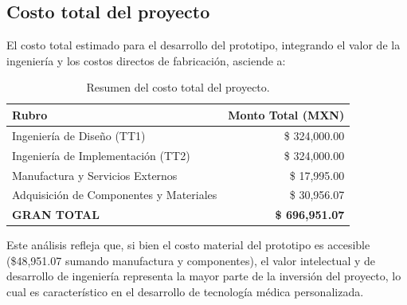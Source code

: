 \subsection{Costo total del proyecto}

El costo total estimado para el desarrollo del prototipo, integrando el valor de la ingeniería y los costos directos de fabricación, asciende a:

\begin{table}[h!]
	\centering
	\caption{Resumen del costo total del proyecto.}
	\label{tab:resumen_total_costos}
	\begin{tabular}{|l|r|}
		\hline
		\rowcolor[HTML]{BFBFBF} 
		\textbf{Rubro} & \textbf{Monto Total (MXN)} \\ \hline
		Ingeniería de Diseño (TT1) & \$ 324,000.00 \\ \hline
		Ingeniería de Implementación (TT2) & \$ 324,000.00 \\ \hline
		Manufactura y Servicios Externos & \$ 17,995.00 \\ \hline
		Adquisición de Componentes y Materiales & \$ 30,956.07 \\ \hline
		\textbf{GRAN TOTAL} & \textbf{\$ 696,951.07} \\ \hline
	\end{tabular}
\end{table}

Este análisis refleja que, si bien el costo material del prototipo es accesible (\$48,951.07 sumando manufactura y componentes), el valor intelectual y de desarrollo de ingeniería representa la mayor parte de la inversión del proyecto, lo cual es característico en el desarrollo de tecnología médica personalizada.